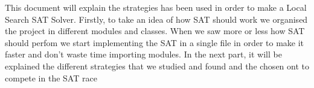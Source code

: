 
This document will explain the strategies has been used in order to make a Local Search SAT Solver. Firstly, to take an idea of how SAT should work we organised the project in different modules and classes. When we saw more or less how SAT should perfom we start implementing the SAT in a single file in order to make it faster and don't waste time importing modules. In the next part, it will be explained the different strategies that we studied and found and the chosen ont to compete in the SAT race

